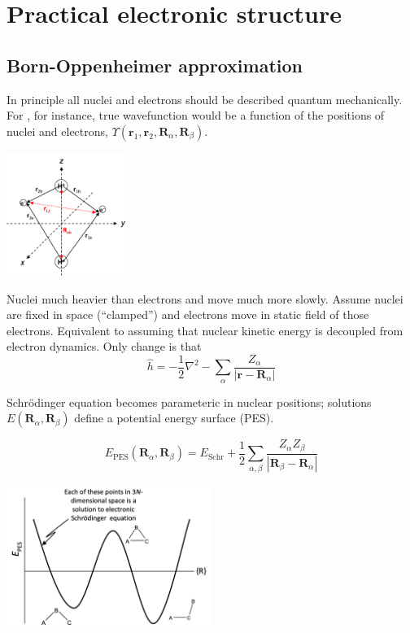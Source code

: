 \documentclass[11pt]{article}
\begin{document}
\newpage
\section{Practical electronic structure}
\label{sec:orgf941f6d}
\subsection{Born-Oppenheimer approximation}
\label{sec:org9a24888}
In principle all nuclei and electrons should be described quantum mechanically.  For ,
for instance, true wavefunction would be a function of the positions of nuclei and
electrons, \(\Upsilon(\mathbf{r}_{1}, \mathbf{r}_{2},\mathbf{R}_{\alpha},\mathbf{R}_{\beta})\).

\begin{center}
\includegraphics[width=0.3\textwidth]{./Images/BornOppenheimer.png}
\end{center}

Nuclei much heavier than electrons and move much more slowly.  Assume nuclei are fixed in
space (``clamped'') and electrons move in static field of those electrons. Equivalent to
assuming that nuclear kinetic energy is decoupled from electron dynamics.  Only change is that
\[\hat{h} = -\frac{1}{2}\nabla^2 - \sum_\alpha \frac{Z_\alpha}{|\bm{r}-\bm{R}_\alpha|} \]

Schr\"{o}dinger equation becomes parameteric in nuclear positions; solutions
\(E(\mathbf{R}_{\alpha},\mathbf{R}_{\beta})\) define a potential energy surface (PES).

\[E_\text{PES}(\mathbf{R}_{\alpha},\mathbf{R}_{\beta}) = E_\text{Schr} +\frac{1}{2}\sum_{\alpha,\beta}\frac{Z_\alpha Z_\beta }{|\mathbf{R}_{\beta} - \mathbf{R}_{\alpha}|}\]

\begin{center}
\includegraphics[width=0.5\textwidth]{./Images/PES.png}
\end{center}
\end{document}
